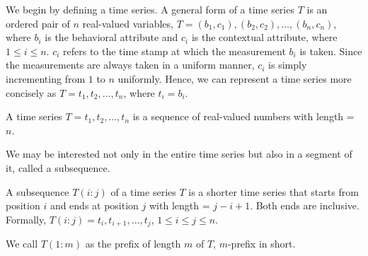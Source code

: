 We begin by defining a time series.
A general form of a time series $T$ is an ordered pair of $n$ real-valued variables, $T = (b_1, c_1), (b_2, c_2), \dots, (b_n, c_n)$, where $b_i$ is the behavioral attribute and $c_i$ is the contextual attribute, where $1 \leq i \leq n$. 
$c_i$ refers to the time stamp at which the measurement $b_i$ is taken.
Since the measurements are always taken in a uniform manner, $c_i$ is simply incrementing from $1$ to $n$ uniformly.
Hence, we can represent a time series more concisely as $T = t_1, t_2, \dots, t_n$, where $t_i = b_i$.

\begin{definition} 
    \label{def:ts}
    A time series $T = t_1, t_2, ..., t_n$ is a sequence of real-valued numbers with length = $n$.
\end{definition}

We may be interested not only in the entire time series but also in a segment of it, called a subsequence.
\begin{definition}[Subsequence] 
    \label{def:subseq}
    A subsequence $T(i:j)$ of a time series $T$ is a shorter time series that starts from position $i$ and ends at position $j$ with length = $j - i + 1$. Both ends are inclusive.
    Formally, $T(i:j) = t_i, t_{i+1}, ..., t_j$, $1 \leq i \leq j \leq n$.
\end{definition}
We call $T(1:m)$ as the prefix of length $m$ of $T$, $m$-prefix in short.


